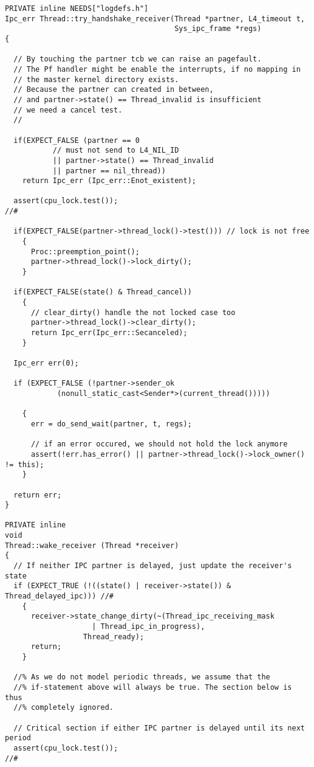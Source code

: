 \begin{lstlisting}
PRIVATE inline NEEDS["logdefs.h"]
Ipc_err Thread::try_handshake_receiver(Thread *partner, L4_timeout t, 
                                       Sys_ipc_frame *regs)
{

  // By touching the partner tcb we can raise an pagefault.
  // The Pf handler might be enable the interrupts, if no mapping in
  // the master kernel directory exists.
  // Because the partner can created in between,
  // and partner->state() == Thread_invalid is insufficient
  // we need a cancel test.
  //

  if(EXPECT_FALSE (partner == 0
		   // must not send to L4_NIL_ID
		   || partner->state() == Thread_invalid
		   || partner == nil_thread))
    return Ipc_err (Ipc_err::Enot_existent);

  assert(cpu_lock.test());                                                 //#
      
  if(EXPECT_FALSE(partner->thread_lock()->test())) // lock is not free
    {
      Proc::preemption_point();
      partner->thread_lock()->lock_dirty();
    }

  if(EXPECT_FALSE(state() & Thread_cancel))
    {
      // clear_dirty() handle the not locked case too
      partner->thread_lock()->clear_dirty();
      return Ipc_err(Ipc_err::Secanceled);
    }

  Ipc_err err(0);
  
  if (EXPECT_FALSE (!partner->sender_ok
		    (nonull_static_cast<Sender*>(current_thread()))))
  
    {
      err = do_send_wait(partner, t, regs);

      // if an error occured, we should not hold the lock anymore
      assert(!err.has_error() || partner->thread_lock()->lock_owner() != this);
    }

  return err;
}

PRIVATE inline
void
Thread::wake_receiver (Thread *receiver)
{
  // If neither IPC partner is delayed, just update the receiver's state
  if (EXPECT_TRUE (!((state() | receiver->state()) & Thread_delayed_ipc))) //#
    {
      receiver->state_change_dirty(~(Thread_ipc_receiving_mask
				    | Thread_ipc_in_progress),
				  Thread_ready);
      return;
    }

  //% As we do not model periodic threads, we assume that the
  //% if-statement above will always be true. The section below is thus
  //% completely ignored.

  // Critical section if either IPC partner is delayed until its next period
  assert(cpu_lock.test());                                                 //#
  

\end{lstlisting}
